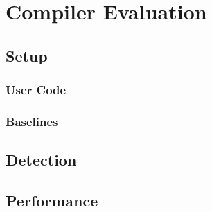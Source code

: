 \documentclass[manuscript,screen,review]{acmart}
\begin{document}
\section{Compiler Evaluation}
\subsection{Setup}
\subsubsection{User Code}
\subsubsection{Baselines}
\subsection{Detection}
\subsection{Performance}
\end{document}
